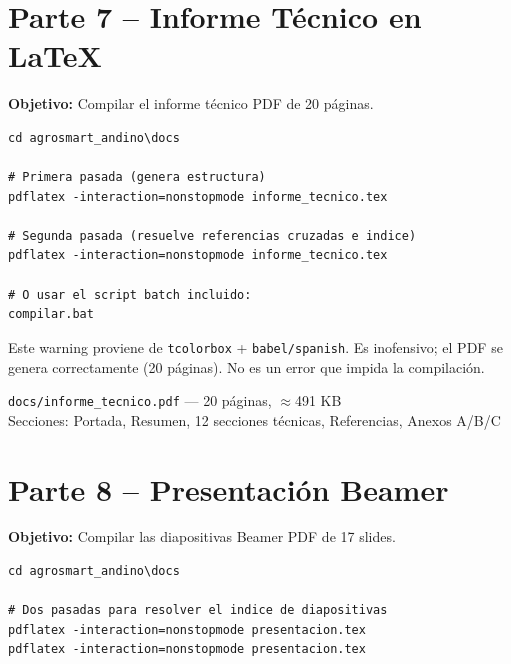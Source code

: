 \documentclass[11pt,a4paper]{article}
\begin{document}
\section{Parte 7 -- Informe T\'ecnico en LaTeX}

\textbf{Objetivo:} Compilar el informe t\'ecnico PDF de 20 p\'aginas.

\begin{localbox}
\begin{lstlisting}[style=bash]
cd agrosmart_andino\docs

# Primera pasada (genera estructura)
pdflatex -interaction=nonstopmode informe_tecnico.tex

# Segunda pasada (resuelve referencias cruzadas e indice)
pdflatex -interaction=nonstopmode informe_tecnico.tex

# O usar el script batch incluido:
compilar.bat
\end{lstlisting}
\end{localbox}

\begin{alertbox}
Este warning proviene de \texttt{tcolorbox} + \texttt{babel/spanish}. Es inofensivo;
el PDF se genera correctamente (20 p\'aginas). No es un error que impida la
compilaci\'on.
\end{alertbox}

\begin{okbox}[]
\texttt{docs/informe\_tecnico.pdf} --- 20 p\'aginas, $\approx$491 KB\\
Secciones: Portada, Resumen, 12 secciones t\'ecnicas, Referencias, Anexos A/B/C
\end{okbox}

\section{Parte 8 -- Presentaci\'on Beamer}

\textbf{Objetivo:} Compilar las diapositivas Beamer PDF de 17 slides.

\begin{localbox}
\begin{lstlisting}[style=bash]
cd agrosmart_andino\docs

# Dos pasadas para resolver el indice de diapositivas
pdflatex -interaction=nonstopmode presentacion.tex
pdflatex -interaction=nonstopmode presentacion.tex
\end{lstlisting}
\end{localbox}
\end{document}
